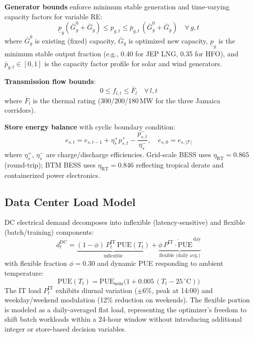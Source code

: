 \documentclass[conference,10pt]{IEEEtran}
\begin{document}
\noindent\textbf{Generator bounds} enforce minimum stable generation and time-varying capacity factors for variable RE:
\begin{equation}
\underline{p}_g (\bar{G}_g^{0} + \bar{G}_g) \leq p_{g,t} \leq \bar{p}_{g,t}\, (\bar{G}_g^{0} + \bar{G}_g) \quad \forall\, g,t
\label{eq:gen}
\end{equation}
where $\bar{G}_g^{0}$ is existing (fixed) capacity, $\bar{G}_g$ is optimized new capacity, $\underline{p}_g$ is the minimum stable output fraction (e.g., 0.40 for JEP LNG, 0.35 for HFO), and $\bar{p}_{g,t} \in [0,1]$ is the capacity factor profile for solar and wind generators.

\noindent\textbf{Transmission flow bounds}:
\begin{equation}
0 \leq f_{l,t} \leq \bar{F}_l \quad \forall\, l,t
\label{eq:tx}
\end{equation}
where $\bar{F}_l$ is the thermal rating (300/200/180\,MW for the three Jamaica corridors).

\noindent\textbf{Store energy balance} with cyclic boundary condition:
\begin{equation}
e_{s,t} = e_{s,t-1} + \eta_s^{+} p_{s,t}^{+} - \frac{p_{s,t}^{-}}{\eta_s^{-}}, \quad e_{s,0} = e_{s,|\mathcal{T}|}
\label{eq:store}
\end{equation}
where $\eta_s^{+}$, $\eta_s^{-}$ are charge/discharge efficiencies. Grid-scale BESS uses $\eta_{\text{RT}} = 0.865$ (round-trip); BTM BESS uses $\eta_{\text{RT}} = 0.846$ reflecting tropical derate and containerized power electronics.

\subsection{Data Center Load Model}

DC electrical demand decomposes into inflexible (latency-sensitive) and flexible (batch/training) components:
\begin{equation}
d_t^{\text{DC}} = \underbrace{(1-\phi)\, P_t^{\text{IT}}\, \text{PUE}(T_t)}_{\text{inflexible}} + \underbrace{\phi\, \overline{P^{\text{IT}} \cdot \text{PUE}}^{\,\text{day}}}_{\text{flexible (daily avg.)}}
\label{eq:dc}
\end{equation}
with flexible fraction $\phi=0.30$ and dynamic PUE responding to ambient temperature:
\begin{equation}
\text{PUE}(T_t) = \text{PUE}_{\text{nom}}\bigl(1 + 0.005\,(T_t - 25\,^\circ\text{C})\bigr)
\label{eq:pue}
\end{equation}
The IT load $P_t^{\text{IT}}$ exhibits diurnal variation ($\pm 6\%$, peak at 14:00) and weekday/weekend modulation (12\% reduction on weekends). The flexible portion is modeled as a daily-averaged flat load, representing the optimizer's freedom to shift batch workloads within a 24-hour window without introducing additional integer or store-based decision variables.
\end{document}
